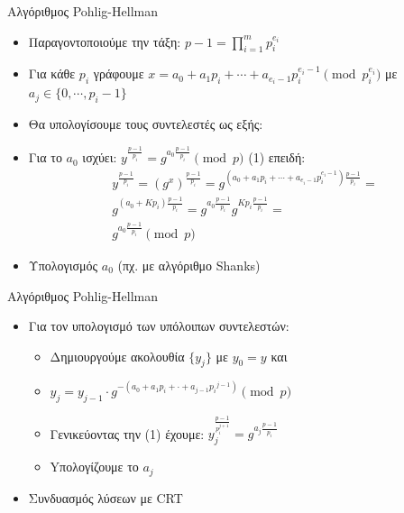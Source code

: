 \documentclass[handout]{beamer}
\begin{document}
\begin{frame}{Αλγόριθμος Pohlig-Hellman} 
\begin{small}
\begin{itemize}
\item Παραγοντοποιούμε την τάξη: $p-1 = \prod_{i=1}^m p_i^{e_i}$ \pause
\item Για κάθε $p_i$ γράφουμε  $x = a_0+a_1 p_i+\cdots+a_{e_i-1}p_i^{e_i-1} \pmod{p_i^{e_i}}$ με $a_j \in \{0,\cdots,p_{i}-1\}$
\item Θα υπολογίσουμε τους συντελεστές ως εξής: 
\item Για το $a_0$ ισχύει: $y^\frac{p-1}{p_i} = g^{a_0\frac{p-1}{p_i}} \pmod{p}$ (1) επειδή:
 \begin{align*} y^\frac{p-1}{p_i} = (g^{x})^{\frac{p-1}{p_i}} = g^{ (a_0+a_1 p_i+\cdots+a_{e_i-1}p_i^{e_i-1}) \frac{p-1}{p_i}}  =\\  
	 g^{ (a_0+Kp_i) \frac{p-1}{p_i}} = g^{ a_0 \frac{p-1}{p_i}} g^{ Kp_i \frac{p-1}{p_i}}  = \\
	 g^{a_0\frac{p-1}{p_i}} \pmod{p} \end{align*} \pause
\item Υπολογισμός $a_0$ (πχ. με αλγόριθμο Shanks) 
\end{itemize}
\end{small}
\end{frame}

\begin{frame}{Αλγόριθμος Pohlig-Hellman} 
\begin{small}
\begin{itemize}
\item Για τον υπολογισμό των υπόλοιπων συντελεστών:
\begin{itemize}
	\item Δημιουργούμε ακολουθία $\{ y_j \}$ με $y_0=y$ και
	\item $y_{j} = y_{j-1} \cdot g^{-(a_0+a_1p_i+\cdot+a_{j-1}{p_i}^{j-1})} \pmod{p}$
	\item Γενικεύοντας την (1) έχουμε: $y_{j}^\frac{p-1}{p_i^{j+1}} = g^{a_j \frac{p-1}{p_i}}$ 
	\item Yπολογίζουμε το $a_j$
\end{itemize}  
\item Συνδυασμός λύσεων με CRT  
\end{itemize}
\end{small}
\end{frame}
\end{document}
